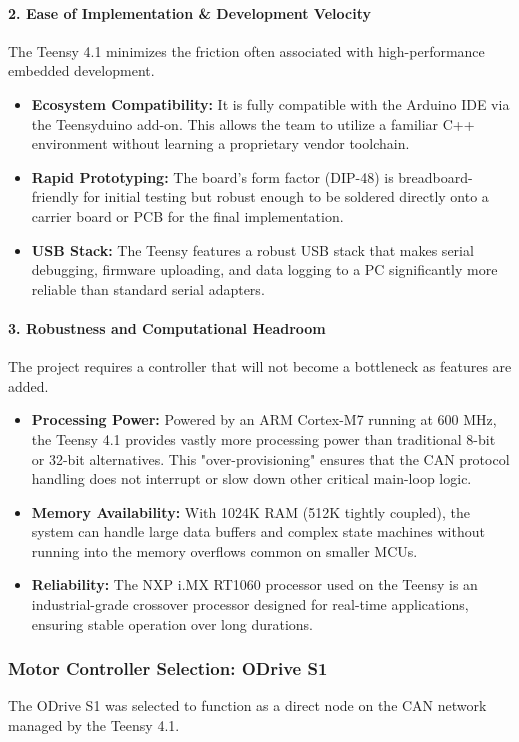 \documentclass[12pt]{article}
\begin{document}
\paragraph{2. Ease of Implementation \& Development Velocity}
The Teensy 4.1 minimizes the friction often associated with high-performance embedded development.
\begin{itemize}
    \item \textbf{Ecosystem Compatibility:} It is fully compatible with the Arduino IDE via the Teensyduino add-on. This allows the team to utilize a familiar C++ environment without learning a proprietary vendor toolchain.
    \item \textbf{Rapid Prototyping:} The board's form factor (DIP-48) is breadboard-friendly for initial testing but robust enough to be soldered directly onto a carrier board or PCB for the final implementation.
    \item \textbf{USB Stack:} The Teensy features a robust USB stack that makes serial debugging, firmware uploading, and data logging to a PC significantly more reliable than standard serial adapters.
\end{itemize}

\paragraph{3. Robustness and Computational Headroom}
The project requires a controller that will not become a bottleneck as features are added.
\begin{itemize}
    \item \textbf{Processing Power:} Powered by an ARM Cortex-M7 running at 600 MHz, the Teensy 4.1 provides vastly more processing power than traditional 8-bit or 32-bit alternatives. This "over-provisioning" ensures that the CAN protocol handling does not interrupt or slow down other critical main-loop logic.
    \item \textbf{Memory Availability:} With 1024K RAM (512K tightly coupled), the system can handle large data buffers and complex state machines without running into the memory overflows common on smaller MCUs.
    \item \textbf{Reliability:} The NXP i.MX RT1060 processor used on the Teensy is an industrial-grade crossover processor designed for real-time applications, ensuring stable operation over long durations.
\end{itemize}

\subsubsection{Motor Controller Selection: ODrive S1}
The ODrive S1 was selected to function as a direct node on the CAN network managed by the Teensy 4.1.
\end{document}
